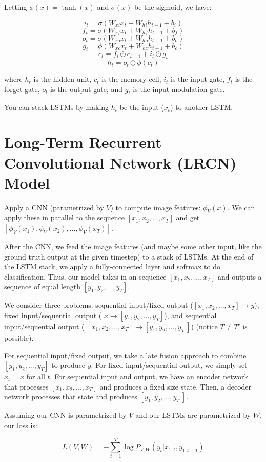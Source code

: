 \documentclass[a4paper]{article}
\begin{document}
Letting $\phi(x) = \tanh(x)$ and $\sigma(x)$ be the sigmoid, we have:

$$
i_t = \sigma(W_{xi} x_t + W_{hi} h_{t-1} + b_i)
$$
$$
f_t = \sigma(W_{xf} x_t + W_{hf} h_{t-1} + b_f)
$$
$$
o_t = \sigma(W_{xo} x_t + W_{ho} h_{t-1} + b_o)
$$
$$
g_t = \phi(W_{xc} x_t + W_{hc} h_{t-1} + b_c)
$$
$$
c_t = f_t \odot c_{t-1} + i_t \odot g_t
$$
$$
h_t = o_t \odot \phi(c_t)
$$

where $h_t$ is the hidden unit, $c_t$ is the memory cell, $i_t$ is the input
gate, $f_t$ is the forget gate, $o_t$ is the output gate, and $g_t$ is the
input modulation gate.

You can stack LSTMs by making $h_t$ be the input ($x_t$) to another LSTM.

\section{Long-Term Recurrent Convolutional Network (LRCN) Model}
Apply a CNN (parametrized by $V$) to compute image features: $\phi_V(x)$.
We can apply these in parallel to the sequence $[x_1, x_2, ..., x_T]$ and get
$[\phi_V(x_1), \phi_V(x_2), ..., \phi_V(x_T)]$.

After the CNN, we feed the image features (and maybe some other input, like
the ground truth output at the given timestep) to a stack of LSTMs. At the
end of the LSTM stack, we apply a fully-connected layer and softmax to do
classification. Thus, our model takes in an sequence $[x_1, x_2, ..., x_T]$
and outputs a sequence of equal length $[y_1, y_2, ..., y_T]$.

We consider three problems: sequential input/fixed output
($[x_1, x_2, ..., x_T] \rightarrow y$), fixed input/sequential output (
$x \rightarrow [y_1, y_2, ..., y_T]$), and sequential input/sequential output (
$[x_1, x_2, ..., x_T] \rightarrow [y_1, y_2, ..., y_{T'}]$) (notice $T \ne T'$
is possible).

For sequential input/fixed output, we take a late fusion approach to combine
$[y_1, y_2, ..., y_T]$ to produce $y$. For fixed input/sequential output,
we simply set $x_t = x$ for all $t$. For sequential input and output, we have
an encoder network that processes $[x_1, x_2, ..., x_T]$ and produces a fixed
size state. Then, a decoder network processes that state and produces
$[y_1, y_2, ..., y_{T'}]$.

Assuming our CNN is parametrized by $V$ and our LSTMs are parametrized by $W$,
our loss is:

$$
L(V, W) = - \sum_{t = 1}^{T}{\log{P_{V, W}(y_t | x_{1:t}, y_{1:t-1})}}
$$
\end{document}
